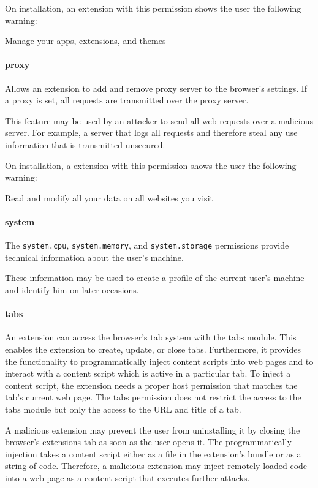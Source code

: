 	On installation, an extension with this permission shows the user the following warning:
	\begin{permissionwarning}
		Manage your apps, extensions, and themes 
	\end{permissionwarning}
	
\paragraph{proxy}
	Allows an extension to add and remove proxy server to the browser's settings. If a proxy is set, all requests are transmitted over the proxy server.
	
	This feature may be used by an attacker to send all web requests over a malicious server. For example, a server that logs all requests and therefore steal any use information that is transmitted unsecured.
	
	On installation, a extension with this permission shows the user the following warning:
	\begin{permissionwarning}
		Read and modify all your data on all websites you visit 
	\end{permissionwarning}
	
\paragraph{system}
	The \texttt{system.cpu}, \texttt{system.memory}, and \texttt{system.storage} permissions provide technical information about the user's machine.
	
	These information may be used to create a profile of the current user's machine and identify him on later occasions.
	
\paragraph{tabs}
	An extension can access the browser's tab system with the tabs module. This enables the extension to create, update, or close tabs. Furthermore, it provides the functionality to programmatically inject content scripts into web pages and to interact with a content script which is active in a particular tab. To inject a content script, the extension needs a proper host permission that matches the tab's current web page. The tabs permission does not restrict the access to the tabs module but only the access to the URL and title of a tab. 
	
	A malicious extension may prevent the user from uninstalling it by closing the browser's extensions tab as soon as the user opens it. The programmatically injection takes a content script either as a file in the extension's bundle or as a string of code. Therefore, a malicious extension may inject remotely loaded code into a web page as a content script that executes further attacks.
	
